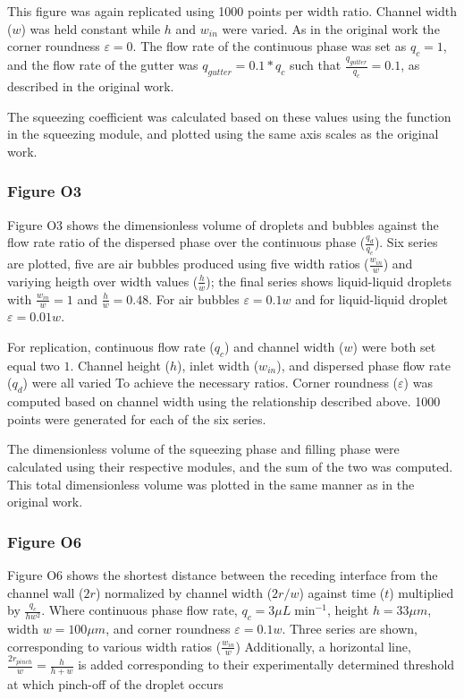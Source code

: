 This figure was again replicated using 1000 points per width ratio. Channel width ($w$) was
held constant while $h$ and $w_{in}$ were varied. As in the original work the corner roundness
$\varepsilon=0$. The flow rate of the continuous phase was set as $q_c=1$, and the flow rate of the
gutter was $q_{gutter}=0.1*q_c$ such that $\frac{q_{gutter}}{q_c}=0.1$, as described in the original
work.

The squeezing coefficient was calculated based on these values using the function in the
squeezing module, and plotted using the same axis scales as the original work.

\subsubsection{Figure O3}

Figure O3 shows the dimensionless volume of droplets and bubbles against the flow rate ratio
of the dispersed phase over the continuous phase ($\frac{q_d}{q_c}$). Six series are plotted,
five are air bubbles produced using five width ratios ($\frac{w_{in}}{w}$) and variying heigth over width
values ($\frac{h}{w}$); the final series shows liquid-liquid droplets with $\frac{w_{in}}{w} = 1$ and
$\frac{h}{w}=0.48$. For air bubbles $\varepsilon=0.1w$ and for liquid-liquid droplet $\varepsilon=0.01w$.

For replication, continuous flow rate ($q_c$) and channel width ($w$) were both set equal two $1$.
Channel height ($h$), inlet width ($w_{in}$), and dispersed phase flow rate ($q_d$) were all varied To
achieve the necessary ratios. Corner roundness ($\varepsilon$) was computed based on channel width using the
relationship described above. 1000 points were generated for each of the six series.

The dimensionless volume of the squeezing phase and filling phase were calculated using their
respective modules, and the sum of the two was computed. This total dimensionless volume was plotted
in the same manner as in the original work.

\subsubsection{Figure O6}

Figure O6 shows the shortest distance between the receding interface from the channel wall ($2r$) normalized
by channel width ($2r/w$) against time ($t$) multiplied by $\frac{q_c}{hw^2}$. Where continuous phase
flow rate, $q_c = 3{\mu}L\;\mathrm{min}^{-1}$, height $h=33{\mu}m$, width $w=100{\mu}m$, and corner roundness
$\varepsilon=0.1w$. Three series are shown, corresponding to various width ratios ($\frac{w_{in}}{w}$)
Additionally, a horizontal line, $\frac{2r_{pinch}}{w}=\frac{h}{h+w}$ is added corresponding to
their experimentally determined threshold at which pinch-off of the droplet occurs

